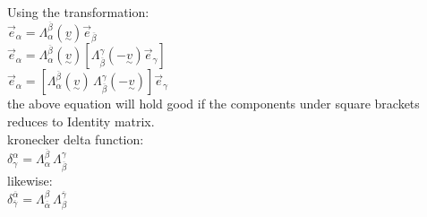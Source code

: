 \documentclass[11pt,a4paper]{article}
\begin{document}
\begin{enumerate}
\begin{enumerate}
                        Using the transformation:\\
                        $\vec{e}_{\alpha} = \Lambda^{\overline{\beta}}_{\alpha}(\underset{\sim}{v})\vec{e}_{\overline{\beta}}$\\
                        $\vec{e}_{\alpha} = \Lambda^{\overline{\beta}}_{\alpha}(\underset{\sim}{v})\left[\Lambda^{\gamma}_{\overline{\beta}}(-\underset{\sim}{v})\vec{e}_{\gamma}\right]$\\
                        $\vec{e}_{\alpha} = \left[\Lambda^{\overline{\beta}}_{\alpha}(\underset{\sim}{v})\, \Lambda^{\gamma}_{\overline{\beta}}(-\underset{\sim}{v})\right]\vec{e}_{\gamma}$\\
                        the above equation will hold good if the components under square brackets reduces to Identity matrix.\\
                        kronecker delta function:\\
                        $\delta^{\alpha}_{\gamma}= \Lambda^{\overline{\beta}}_{\alpha}\, \Lambda^{\gamma}_{\overline{\beta}}$\\
                        likewise:\\
                        $\delta^{\overline\alpha}_{\overline\gamma}= \Lambda^{\beta}_{\overline\alpha}\, \Lambda^{\overline\gamma}_{\beta}$\\


\end{enumerate}
\end{enumerate}
\end{document}
